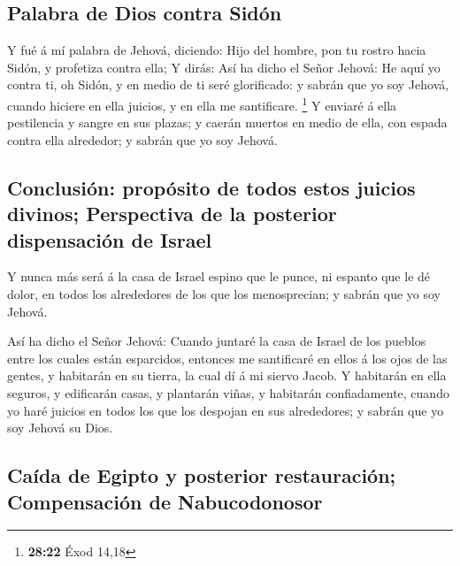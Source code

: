 \hypertarget{palabra-de-dios-contra-siduxf3n}{%
\subsection{Palabra de Dios contra
Sidón}\label{palabra-de-dios-contra-siduxf3n}}

 Y fué á mí palabra de Jehová, diciendo: 
Hijo del hombre, pon tu rostro hacia Sidón, y profetiza contra ella;
 Y dirás: Así ha dicho el Señor Jehová: He aquí yo contra
ti, oh Sidón, y en medio de ti seré glorificado: y sabrán que yo soy
Jehová, cuando hiciere en ella juicios, y en ella me santificare.
\footnote{\textbf{28:22} Éxod 14,18}  Y enviaré á ella
pestilencia y sangre en sus plazas; y caerán muertos en medio de ella,
con espada contra ella alrededor; y sabrán que yo soy Jehová.

\hypertarget{conclusiuxf3n-propuxf3sito-de-todos-estos-juicios-divinos-perspectiva-de-la-posterior-dispensaciuxf3n-de-israel}{%
\subsection{Conclusión: propósito de todos estos juicios divinos;
Perspectiva de la posterior dispensación de
Israel}\label{conclusiuxf3n-propuxf3sito-de-todos-estos-juicios-divinos-perspectiva-de-la-posterior-dispensaciuxf3n-de-israel}}

 Y nunca más será á la casa de Israel espino que le
punce, ni espanto que le dé dolor, en todos los alrededores de los que
los menosprecian; y sabrán que yo soy Jehová.

 Así ha dicho el Señor Jehová: Cuando juntaré la casa de
Israel de los pueblos entre los cuales están esparcidos, entonces me
santificaré en ellos á los ojos de las gentes, y habitarán en su tierra,
la cual dí á mi siervo Jacob.  Y habitarán en ella
seguros, y edificarán casas, y plantarán viñas, y habitarán
confiadamente, cuando yo haré juicios en todos los que los despojan en
sus alrededores; y sabrán que yo soy Jehová su Dios.

\hypertarget{cauxedda-de-egipto-y-posterior-restauraciuxf3n-compensaciuxf3n-de-nabucodonosor}{%
\subsection{Caída de Egipto y posterior restauración; Compensación de
Nabucodonosor}\label{cauxedda-de-egipto-y-posterior-restauraciuxf3n-compensaciuxf3n-de-nabucodonosor}}

